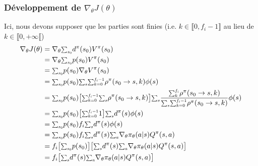 \documentclass[8pt]{beamer}
\begin{document}
\begin{frame}
  \frametitle{Développement de $\nabla_\theta J(\theta)$}
  Ici, nous devons supposer que les parties sont finies (i.e. $k \in \llbracket 0, f_i - 1 \rrbracket$ au lieu de $k \in \llbracket 0, +\infty \llbracket$)
  \begin{align*}
    \nabla_\theta J(\theta) &= \nabla_{\theta} {\scalebox{0.85}{$\sum_{s_0}$}} d^\pi(s_0) V^\pi(s_0) \\
    &= \nabla_{\theta}{\scalebox{0.85}{$\sum_{s_0}$}}p(s_0)V^{\pi}(s_0) \\
    &= {\scalebox{0.85}{$\sum_{s_0}$}}p(s_0)\nabla_{\theta}V^{\pi}(s_0) \\
    &= {\scalebox{0.85}{$\sum_{s_0}$}}p(s_0){\scalebox{0.85}{$\sum_{s}$}}{\scalebox{0.85}{$\sum_{k=0}^{f_i - 1}$}}\rho^{\pi}(s_0 \rightarrow s, k)\phi( s)\\
    &= {\scalebox{0.85}{$\sum_{s_0}$}}p(s_0)\big[{\scalebox{0.85}{$\sum_{k=0}^{f_i - 1}$}}{\scalebox{0.85}{$\sum_{s}$}}\rho^{\pi}(s_0 \rightarrow s, k)\big] {\scalebox{0.85}{$\sum_{s}$}}\frac{{\scalebox{0.85}{$\sum_{k}^{f_i}$}}\rho^{\pi}(s_0 \rightarrow s, k)}{{\scalebox{0.85}{$\sum_{s}$}}{\scalebox{0.85}{$\sum_{k=0}^{f_i-1}$}}\rho^{\pi}(s_0 \rightarrow s, k)}\phi(s)\\
    &= {\scalebox{0.85}{$\sum_{s_0}$}}p(s_0)\big[{\scalebox{0.85}{$\sum_{k=0}^{f_i-1}$}}1\big] {\scalebox{0.85}{$\sum_{s}$}}d^{\pi}(s)\phi(s)\\
    &= {\scalebox{0.85}{$\sum_{s_0}$}}p(s_0)f_i {\scalebox{0.85}{$\sum_{s}$}}d^{\pi}(s)\phi(s)\\
    &= {\scalebox{0.85}{$\sum_{s_0}$}}p(s_0)f_i {\scalebox{0.85}{$\sum_{s}$}}d^{\pi}(s) {\scalebox{0.85}{$\sum_{a}$}}\nabla_{\theta}\pi_{\theta}(a|s)Q^{\pi}(s,a)\\
    &= f_i\big[{\scalebox{0.85}{$\sum_{s_0}$}}p(s_0)\big] \big[ {\scalebox{0.85}{$\sum_{s}$}}d^{\pi}(s) {\scalebox{0.85}{$\sum_{a}$}} \nabla_{\theta}\pi_{\theta}(a|s)Q^{\pi}(s,a)\big]\\
    &= f_i\big[{\scalebox{0.85}{$\sum_{s}$}}d^{\pi}(s) {\scalebox{0.85}{$\sum_{a}$}} \nabla_{\theta}\pi_{\theta}(a|s)Q^{\pi}(s,a)\big]
  \end{align*}
  
\end{frame}
\end{document}
